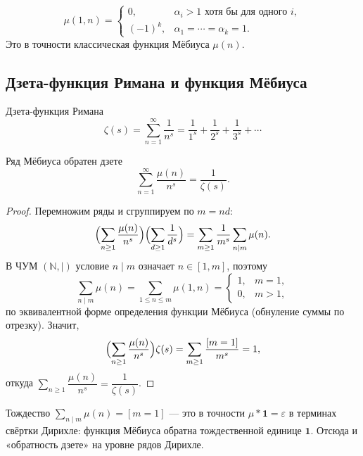 \begin{Corollary}{}{}
	\[
	\mu(1,n)=
	\begin{cases}
		0, & \alpha_i>1\text{ хотя бы для одного }i,\\
		(-1)^k, & \alpha_1=\cdots=\alpha_k=1.
	\end{cases}
	\]
	Это в точности классическая функция Мёбиуса $\mu(n)$.
\end{Corollary}

\subsection{Дзета-функция Римана и функция Мёбиуса}

\begin{Definition}{Дзета-функция Римана}{}
	\[
	\zeta(s)=\sum_{n=1}^{\infty}\frac{1}{n^s}=\frac{1}{1^s}+\frac{1}{2^s}+\frac{1}{3^s}+\cdots
	\]
\end{Definition}

\begin{Theorem}{Ряд Мёбиуса обратен дзете}{}
	\[
	\sum_{n=1}^{\infty}\frac{\mu(n)}{n^s}=\frac{1}{\zeta(s)}.
	\]
\end{Theorem}

\begin{proof}
	Перемножим ряды и сгруппируем по $m=nd$:
	\[
	\Bigl(\sum_{n\ge 1}\frac{\mu(n)}{n^s}\Bigr)\Bigl(\sum_{d\ge 1}\frac{1}{d^s}\Bigr)
	=\sum_{m\ge 1}\frac{1}{m^s}\sum_{n\mid m}\mu(n).
	\]
	В ЧУМ $(\mathbb N,\mid)$ условие $n\mid m$ означает $n\in[1,m]$, поэтому
	\[
	\sum_{n\mid m}\mu(n)=\sum_{1\le n\le m}\mu(1,n)=
	\begin{cases}1,&m=1,\\0,&m>1,\end{cases}
	\]
	по эквивалентной форме определения функции Мёбиуса (обнуление суммы по отрезку). Значит,
	\[
	\Bigl(\sum_{n\ge 1}\frac{\mu(n)}{n^s}\Bigr)\zeta(s)=\sum_{m\ge 1}\frac{[m=1]}{m^s}=1,
	\]
	откуда $\sum_{n\ge 1}\dfrac{\mu(n)}{n^s}=\dfrac{1}{\zeta(s)}$.
\end{proof}

\begin{Remark}{}{}
	Тождество $\sum_{n\mid m}\mu(n)=[m=1]$ — это в точности $\mu*\mathbf 1=\varepsilon$ в терминах свёртки Дирихле: функция Мёбиуса обратна тождественной единице $\mathbf 1$. Отсюда и «обратность дзете» на уровне рядов Дирихле.
\end{Remark}

